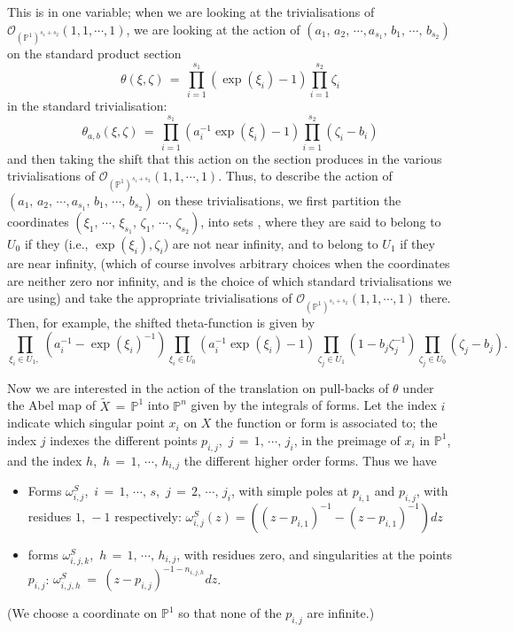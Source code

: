 \documentclass[12pt,reqno]{amsart}
\numberwithin{equation}{section}
\theoremstyle{definition}
\theoremstyle{remark}
\def\bP{{\mathbb {P}}}
\def\pO{{\mathcal O}}
\begin{document}
This is in one variable; when we are looking at the trivialisations of ${\pO}_{(\bP^1)^{s_1+s_2}}(1,1,\cdots ,1)$, we
are looking at
the action of $(a_1,\, a_2,\, \cdots , a_{s_1},\, b_1,\,\cdots ,\,b_{s_2})$ on the standard product section
$$\theta(\xi,\zeta)\,=\,\prod_{i=1}^{s_1} (\exp(\xi_i)-1) \prod_{i=1}^{s_2}\zeta_i$$
in the standard trivialisation:
$$\theta_{a,b}(\xi,\zeta)\,=\,\prod_{i=1}^{s_1} (a_i^{-1}\exp(\xi_i)-1) \prod_{i=1}^{s_2}(\zeta_i-b_i)$$
and then taking the shift that this action on the section produces in the various    trivialisations of
${\pO}_{(\bP^1)^{s_1+s_2}}(1,1,\cdots ,1)$.    Thus, to describe
the action of $(a_1,\, a_2,\, \cdots , a_{s_1},\, b_1,\,\cdots ,\,b_{s_2})$ on these trivialisations, we first
partition the 
   coordinates $(\xi_1,\,\cdots ,\,\xi_{s_1},\, \zeta_1,\,\cdots ,\,\zeta_{s_2}) $, into sets , where they are said to belong to $U_0$ if
they (i.e., $\exp(\xi_i), \zeta_i$) are not near infinity, and to belong to $U_1$ if they are near infinity, (which of course involves arbitrary choices
when the coordinates are neither zero nor infinity, and is the choice of which standard trivialisations
we are using) and take the appropriate trivialisations of $\pO_{(\bP^1)^{s_1+s_2}}(1,1,\cdots ,1)$ there. Then, for
example, the shifted theta-function  is given by
$$ \prod_{\xi_{i}\in U_1,\,  } (a_{i}^{-1}-\exp(\xi_i)^{-1}) \prod_{\xi_i\in U_0} (a_{i}^{-1}\exp(\xi_i )- 1) \prod_{\zeta_{j} \in U_1} (1-b_{j}\zeta_{j}^{-1})\prod_{\zeta_{j} \in U_0} (\zeta_{j}-b_{j}).$$
 
 


Now we are interested in the action of the translation on pull-backs of $\theta$ under the Abel
map of ${\widetilde X}\,=\, \bP^1$ into $\bP^n$ given by the integrals of forms. 
Let  the index $i$ indicate which singular point $x_i$ on $X$ the function  or form is associated to; the index
$j$ indexes the different points $p_{i,j}$,\, $j\,=\,1,\,\cdots ,\, j_i$, in the preimage of $x_i$ in $\bP^1$, and the
index $h$,\, $h\,=\, 1,\, \cdots ,\,h_{i,j}$ the different higher order forms. Thus we have 
\begin{itemize}
\item Forms $\omega^S_{i, j}$,\, $i\,=\,1,\,\cdots ,\,s$,\, $j\,=\, 2,\,\cdots ,\,j_i$,
with simple poles at $p_{i,1}$ and $p_{i,j}$, with residues $1,\, -1$ respectively: $\omega^S_{i, j}(z) = ((z-p_{i,1})^{-1}- (z-p_{i,1})^{-1})dz$

\item forms  $\omega^{S}_{i,j,k}$,\, $h \,=\, 1,\,\cdots ,\,h_{i,j}$, with residues zero, and singularities at the
points $p_{i,j}$: $\omega^{S}_{i,j,h}\  =\ (z-p_{i,j})^{-1-n_{i,j,h}} dz$.
\end{itemize}
(We choose  a coordinate on $\bP^1$ so that none of the $p_{i,j}$ are infinite.)
 
\end{document}
